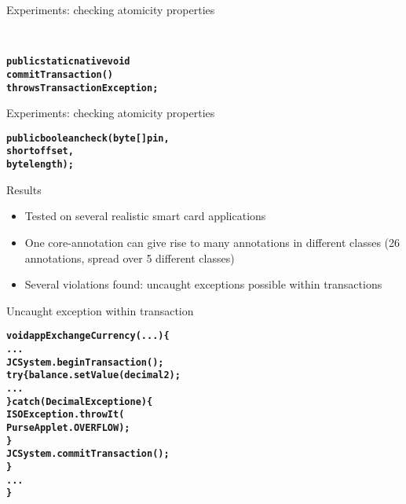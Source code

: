 \documentclass[final,nocolorBG,a4,marieke,nototal,pdf, accumulate,slideColor]{prosper}
\begin{document}
\begin{slide}{Experiments: checking atomicity properties}

\smallskip\\

\begin{alltt}
\textbf{
public static native void 
   commitTransaction() 
         throws TransactionException;}
\end{alltt}
\end{slide}

\begin{slide}{Experiments: checking atomicity properties}
\smallskip\\

\begin{alltt}
\textbf{
public boolean check(byte[] pin, 
                     short offset, 
                     byte length);}
\end{alltt}
\end{slide}

\begin{slide}{Results}
\begin{itemize}
\item Tested on several realistic smart card applications
\item One core-annotation can give rise to many annotations in
different classes (26 annotations, spread over 5 different classes)
\item Several violations found: uncaught exceptions possible within
transactions 
\end{itemize}
\end{slide}

\begin{slide}{Uncaught exception within transaction}
\begin{alltt}
\textbf{void appExchangeCurrency(...) \{
   ...
   JCSystem.beginTransaction();	
   try \{balance.setValue(decimal2);
            ...
   \} catch (DecimalException e) \{
       ISOException.throwIt(
            PurseApplet.OVERFLOW);
   \}
   JCSystem.commitTransaction();
   \}
   ...
\}}
\end{alltt}
\end{slide}
\end{document}
